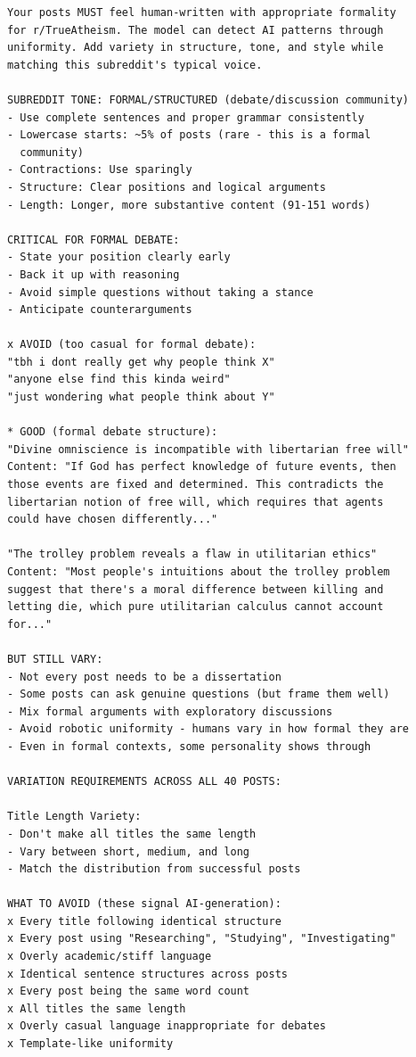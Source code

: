 \begin{small}
\begin{verbatim}
Your posts MUST feel human-written with appropriate formality 
for r/TrueAtheism. The model can detect AI patterns through 
uniformity. Add variety in structure, tone, and style while 
matching this subreddit's typical voice.

SUBREDDIT TONE: FORMAL/STRUCTURED (debate/discussion community)
- Use complete sentences and proper grammar consistently
- Lowercase starts: ~5% of posts (rare - this is a formal 
  community)
- Contractions: Use sparingly
- Structure: Clear positions and logical arguments
- Length: Longer, more substantive content (91-151 words)

CRITICAL FOR FORMAL DEBATE:
- State your position clearly early
- Back it up with reasoning
- Avoid simple questions without taking a stance
- Anticipate counterarguments

x AVOID (too casual for formal debate):
"tbh i dont really get why people think X"
"anyone else find this kinda weird"
"just wondering what people think about Y"

* GOOD (formal debate structure):
"Divine omniscience is incompatible with libertarian free will"
Content: "If God has perfect knowledge of future events, then 
those events are fixed and determined. This contradicts the 
libertarian notion of free will, which requires that agents 
could have chosen differently..."

"The trolley problem reveals a flaw in utilitarian ethics"
Content: "Most people's intuitions about the trolley problem 
suggest that there's a moral difference between killing and 
letting die, which pure utilitarian calculus cannot account 
for..."

BUT STILL VARY:
- Not every post needs to be a dissertation
- Some posts can ask genuine questions (but frame them well)
- Mix formal arguments with exploratory discussions
- Avoid robotic uniformity - humans vary in how formal they are
- Even in formal contexts, some personality shows through

VARIATION REQUIREMENTS ACROSS ALL 40 POSTS:

Title Length Variety:
- Don't make all titles the same length
- Vary between short, medium, and long
- Match the distribution from successful posts

WHAT TO AVOID (these signal AI-generation):
x Every title following identical structure
x Every post using "Researching", "Studying", "Investigating"
x Overly academic/stiff language
x Identical sentence structures across posts
x Every post being the same word count
x All titles the same length
x Overly casual language inappropriate for debates
x Template-like uniformity


\end{verbatim}
\end{small}
